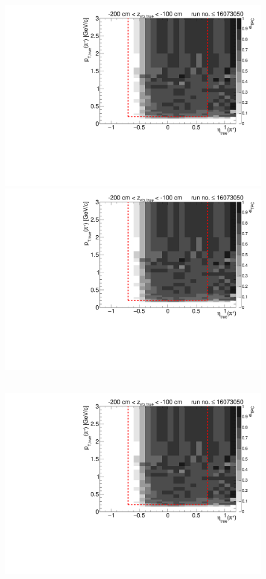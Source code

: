 \begin{figure}[hb]
{  \includegraphics[width=\linewidth,page=7]{graphics/eff/Eff2D_TPC_pion_Plus_RunRange1.pdf}\\
  \includegraphics[width=\linewidth,page=9]{graphics/eff/Eff2D_TPC_pion_Plus_RunRange1.pdf}
}~
\parbox{0.495\textwidth}{
  \centering
  \includegraphics[width=\linewidth,page=4]{graphics/eff/Eff2D_TPC_pion_Plus_RunRange1.pdf}\\
}
\end{figure}

